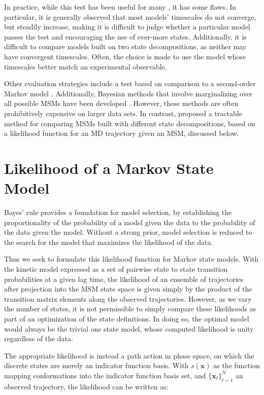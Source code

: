 \documentclass[journal=jpcbfk, layout=twocolumn, manuscript=article]{achemso}
\begin{document}
In practice, while this test has been useful for many \cite{Noe2009Constructing}, it has some flaws. In particular, it is generally observed that most models' timescales do not converge, but steadily increase, making it is difficult to judge whether a particular model passes the test and encouraging the use of ever-more states. Additionally, it is difficult to compare models built on two state decompositions, as neither may have convergent timescales. Often, the choice is made to use the model whose timescales better match an experimental observable.

Other evaluation strategies include a test based on comparison to a second-order Markov model \cite{Park2006Validation}. Additionally, Bayesian methods that involve marginalizing over all possible MSMs have been developed \cite{Bacallado2009Bayesian, *Bacallado2011Bayesian}. However, these methods are often prohibitively expensive on larger data sets. In contrast, \citet{Kellogg2012Evaluation} proposed a tractable method for comparing MSMs built with different state decompositions, based on a likelihood function for an MD trajectory given an MSM, discussed below.

\section{Likelihood of a Markov State Model}
Bayes' rule provides a foundation for model selection, by establishing the proportionality of the probability of a model given the data to the probability of the data given the model. Without a strong prior, model selection is reduced to the search for the model that maximizes the likelihood of the data. 

Thus we seek to formulate this likelihood function for Markov state models. With the kinetic model expressed as a set of pairwise state to state transition probabilities at a given lag time, the likelihood of an ensemble of trajectories after projection into the MSM state space is given simply by the product of the transition matrix elements along the observed trajectories. However, as we vary the number of states, it is not permissible to simply compare these likelihoods as part of an optimization of the state definitions. In doing so, the optimal model would always be the trivial one state model, whose computed likelihood is unity regardless of the data.

The appropriate likelihood is instead a path action in phase space, on which the discrete states are merely an indicator function basis. With $s(\mathbf{x})$ as the function mapping conformations into the indicator function basis set, and $\{\mathbf{x}_t\}_{t=1}^N$ an observed trajectory, the likelihood can be written as:
\end{document}
